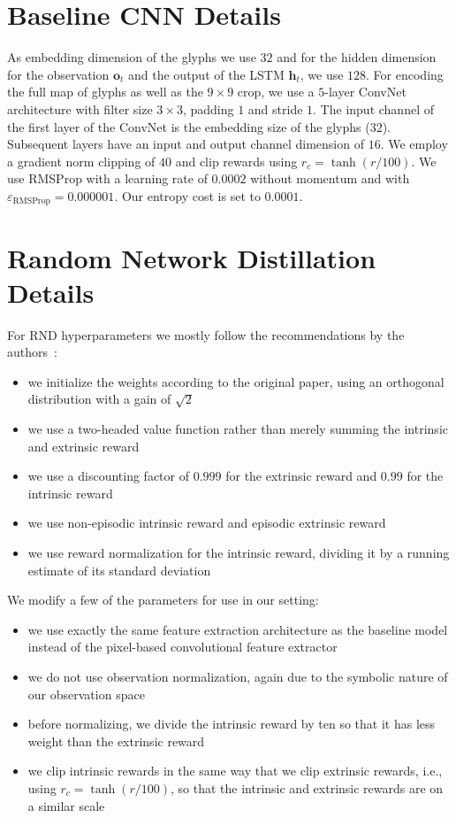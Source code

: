 \documentclass{article}
\begin{document}
\section{Baseline CNN Details}
\label{appendix:baseline}
As embedding dimension of the glyphs we use $32$ and for the hidden dimension for
the observation $\mathbf{o}_t$ and the output of the LSTM $\mathbf{h}_t$,
we use $128$.
For encoding the full map of glyphs as well as the $9\times 9$ crop,
we use a $5$-layer ConvNet architecture with filter size $3\times 3$,
padding $1$ and stride $1$. The input channel of the first layer of
the ConvNet is the embedding size of the glyphs ($32$). Subsequent
layers have an input and output channel dimension of $16$.
We employ a gradient norm clipping of $40$ and clip rewards using $r_c
= \tanh(r / 100)$.
We use RMSProp with a learning rate of $0.0002$ without momentum and
with $\varepsilon_{\textrm{RMSProp}} = 0.000001$. Our entropy cost is set
to $0.0001$.

\section{Random Network Distillation Details}
\label{appendix:rnd}
For RND hyperparameters we mostly follow the recommendations by the authors~\citep{DBLP:conf/iclr/BurdaESK19}:
\begin{itemize}
    \item we initialize the weights according to the original paper, using an orthogonal distribution with a gain of $\sqrt{2}$
    \item we use a two-headed value function rather than merely summing the intrinsic and extrinsic reward
    \item we use a discounting factor of $0.999$ for the extrinsic reward and $0.99$ for the intrinsic reward
    \item we use non-episodic intrinsic reward and episodic extrinsic reward
    \item we use reward normalization for the intrinsic reward, dividing it by a running estimate of its standard deviation
\end{itemize}

We modify a few of the parameters for use in our setting:
\begin{itemize}
    \item we use exactly the same feature extraction architecture as the baseline model instead of the pixel-based convolutional feature extractor
    \item we do not use observation normalization, again due to the symbolic nature of our observation space
    \item before normalizing, we divide the intrinsic reward by ten so that it has less weight than the extrinsic reward
    \item we clip intrinsic rewards in the same way that we clip extrinsic rewards, i.e., using $r_c = \tanh(r / 100)$, so that the intrinsic and extrinsic rewards are on a similar scale
\end{itemize}
\end{document}
